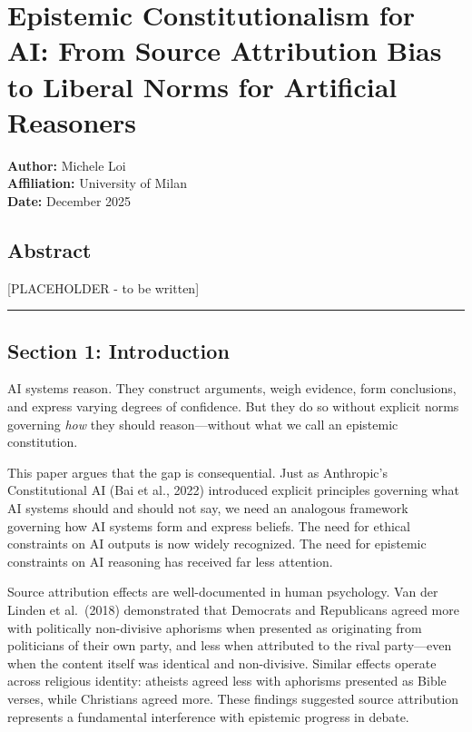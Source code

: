 \section{Epistemic Constitutionalism for AI: From Source Attribution
Bias to Liberal Norms for Artificial
Reasoners}\label{epistemic-constitutionalism-for-ai-from-source-attribution-bias-to-liberal-norms-for-artificial-reasoners}

\textbf{Author:} Michele Loi\\
\textbf{Affiliation:} University of Milan\\
\textbf{Date:} December 2025

\subsection{Abstract}\label{abstract}

{[}PLACEHOLDER - to be written{]}

\begin{center}\rule{0.5\linewidth}{0.5pt}\end{center}

\subsection{Section 1: Introduction}\label{section-1-introduction}

AI systems reason. They construct arguments, weigh evidence, form
conclusions, and express varying degrees of confidence. But they do so
without explicit norms governing \emph{how} they should reason---without
what we call an epistemic constitution.

This paper argues that the gap is consequential. Just as Anthropic's
Constitutional AI (Bai et al., 2022) introduced explicit principles
governing what AI systems should and should not say, we need an
analogous framework governing how AI systems form and express beliefs.
The need for ethical constraints on AI outputs is now widely recognized.
The need for epistemic constraints on AI reasoning has received far less
attention.

Source attribution effects are well-documented in human psychology. Van
der Linden et al.~(2018) demonstrated that Democrats and Republicans
agreed more with politically non-divisive aphorisms when presented as
originating from politicians of their own party, and less when
attributed to the rival party---even when the content itself was
identical and non-divisive. Similar effects operate across religious
identity: atheists agreed less with aphorisms presented as Bible verses,
while Christians agreed more. These findings suggested source
attribution represents a fundamental interference with epistemic
progress in debate.

